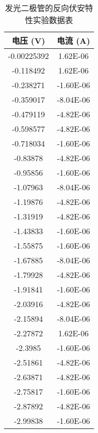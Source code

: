 \documentclass[UTF-8,twoside,cs4size]{ctexart}
\begin{document}
        \begin{table}[htbp]
            \centering
            \begin{tabular}{|c|c|}
            \hline
            电压 (V)    & 电流 (A)    \\ \hline
            -0.00225392  & 1.62E-06     \\ \hline
            -0.118492    & 1.62E-06     \\ \hline
            -0.238271    & -1.60E-06    \\ \hline
            -0.359017    & -8.04E-06    \\ \hline
            -0.479119    & -4.82E-06    \\ \hline
            -0.598577    & -4.82E-06    \\ \hline
            -0.718034    & -1.60E-06    \\ \hline
            -0.83878     & -4.82E-06    \\ \hline
            -0.95856     & -1.60E-06    \\ \hline
            -1.07963     & -8.04E-06    \\ \hline
            -1.19876     & -4.82E-06    \\ \hline
            -1.31919     & -4.82E-06    \\ \hline
            -1.43833     & -1.60E-06    \\ \hline
            -1.55875     & -1.60E-06    \\ \hline
            -1.67885     & -8.04E-06    \\ \hline
            -1.79928     & -4.82E-06    \\ \hline
            -1.91841     & -1.60E-06    \\ \hline
            -2.03916     & -4.82E-06    \\ \hline
            -2.15894     & -8.04E-06    \\ \hline
            -2.27872     & 1.62E-06     \\ \hline
            -2.3985      & -1.60E-06    \\ \hline
            -2.51861     & -4.82E-06    \\ \hline
            -2.63871     & -4.82E-06    \\ \hline
            -2.75817     & -1.60E-06    \\ \hline
            -2.87892     & -4.82E-06    \\ \hline
            -2.99838     & -1.60E-06    \\ \hline
            \end{tabular}
            \caption{发光二极管的反向伏安特性实验数据表}
            \end{table}
\end{document}
